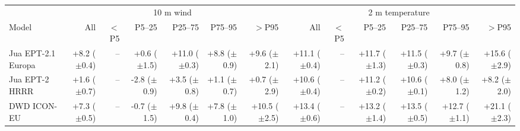 \begin{tabular}{lrrrrrrrrrrrr}
\toprule
& \multicolumn{6}{c}{10 m wind} & \multicolumn{6}{c}{2 m temperature} \\
\cmidrule(lr){2-7} \cmidrule(lr){8-13}
Model & All & $<$P5 & P5--25 & P25--75 & P75--95 & $>$P95 & All & $<$P5 & P5--25 & P25--75 & P75--95 & $>$P95 \\
\midrule
Jua EPT-2.1 Europa & +8.2 ($\pm$0.4) & -- & +0.6 ($\pm$1.5) & +11.0 ($\pm$0.3) & +8.8 ($\pm$0.9) & +9.6 ($\pm$2.1) & +11.1 ($\pm$0.4) & -- & +11.7 ($\pm$1.3) & +11.5 ($\pm$0.3) & +9.7 ($\pm$0.8) & +15.6 ($\pm$2.9) \\
Jua EPT-2 HRRR & +1.6 ($\pm$0.7) & -- & -2.8 ($\pm$0.9) & +3.5 ($\pm$0.8) & +1.1 ($\pm$0.7) & +0.7 ($\pm$2.9) & +10.6 ($\pm$0.4) & -- & +11.2 ($\pm$0.2) & +10.6 ($\pm$0.1) & +8.0 ($\pm$1.2) & +8.2 ($\pm$2.0) \\
DWD ICON-EU & +7.3 ($\pm$0.5) & -- & -0.7 ($\pm$1.5) & +9.8 ($\pm$0.4) & +7.8 ($\pm$1.0) & +10.5 ($\pm$2.5) & +13.4 ($\pm$0.6) & -- & +13.2 ($\pm$1.4) & +13.5 ($\pm$0.5) & +12.7 ($\pm$1.1) & +21.1 ($\pm$2.3) \\
\bottomrule
\end{tabular}
